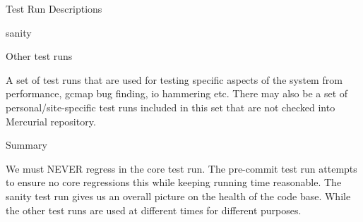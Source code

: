 \begin{section}{Test Run Descriptions}
\begin{subsection}{sanity}
\end{subsection}

\begin{subsection}{Other test runs}

A set of test runs that are used for testing specific aspects of the system from performance, gcmap bug finding, io hammering etc. There may also be a set of personal/site-specific test runs included in this set that are not checked into Mercurial repository.

\end{subsection}

\begin{subsection}{Summary}

We must NEVER regress in the core test run. The pre-commit test run attempts to ensure no core regressions this while keeping running time reasonable. The sanity test run gives us an overall picture on the health of the code base. While the other test runs are used at different times for different purposes.

\end{subsection}

\end{section}
